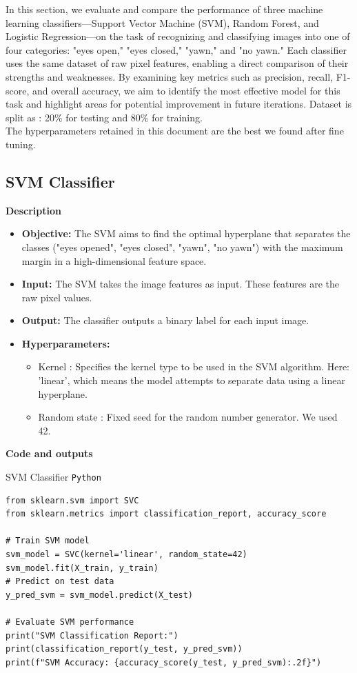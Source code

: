 \documentclass{modeleRapport}
\begin{document}
In this section, we evaluate and compare the performance of three machine learning classifiers—Support Vector Machine (SVM), Random Forest, and Logistic Regression—on the task of recognizing and classifying images into one of four categories: "eyes open," "eyes closed," "yawn," and "no yawn." Each classifier uses the same dataset of raw pixel features, enabling a direct comparison of their strengths and weaknesses. By examining key metrics such as precision, recall, F1-score, and overall accuracy, we aim to identify the most effective model for this task and highlight areas for potential improvement in future iterations. Dataset is split as : 20\% for testing and 80\% for training.
\\The hyperparameters retained in this document are the best we found after fine tuning.
\subsection{SVM Classifier}

\bigskip

\textbf{Description}

\begin{itemize}
    \item \textbf{Objective:} The SVM aims to find the optimal hyperplane that separates the classes ("eyes opened", "eyes closed", "yawn", "no yawn") with the maximum margin in a high-dimensional feature space.

    \item \textbf{Input:} The SVM takes the image features as input. These features are the raw pixel values.

    \item \textbf{Output:} The classifier outputs a binary label for each input image.

    \item \textbf{Hyperparameters:}
    \begin{itemize}
        \item Kernel : Specifies the kernel type to be used in the SVM algorithm. Here: 'linear', which means the model attempts to separate data using a linear hyperplane.
        \item Random state : Fixed seed for the random number generator. We used 42.
    \end{itemize}
\end{itemize}

\textbf{Code and outputs}
\begin{codebox}{SVM Classifier \texttt{Python}}
\begin{verbatim}
from sklearn.svm import SVC
from sklearn.metrics import classification_report, accuracy_score

# Train SVM model
svm_model = SVC(kernel='linear', random_state=42)
svm_model.fit(X_train, y_train)
# Predict on test data
y_pred_svm = svm_model.predict(X_test)

# Evaluate SVM performance
print("SVM Classification Report:")
print(classification_report(y_test, y_pred_svm))
print(f"SVM Accuracy: {accuracy_score(y_test, y_pred_svm):.2f}")
\end{verbatim}
\end{codebox}
\end{document}
